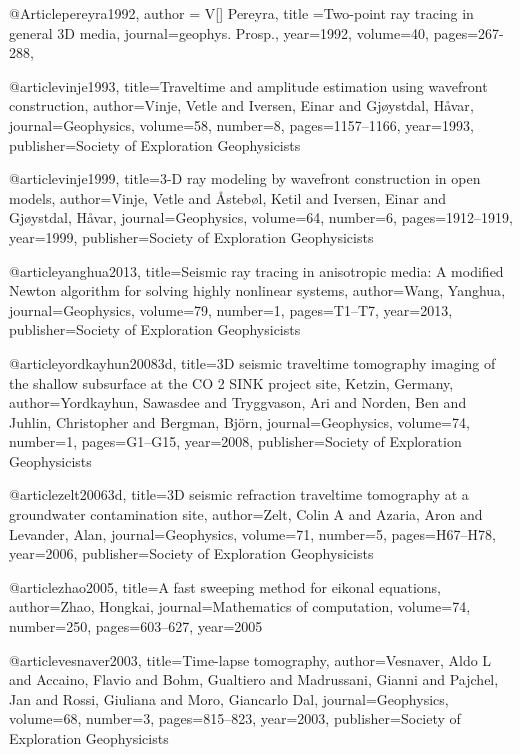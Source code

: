 @Article{pereyra1992,
  author = {V[] Pereyra},
  title ={Two-point ray tracing in general 3{D} media},
  journal={geophys. Prosp.},
  year=1992,
  volume=40,
  pages={267-288},
}


@article{vinje1993,
  title={Traveltime and amplitude estimation using wavefront construction},
  author={Vinje, Vetle and Iversen, Einar and Gj{\o}ystdal, H{\aa}var},
  journal={Geophysics},
  volume={58},
  number={8},
  pages={1157--1166},
  year={1993},
  publisher={Society of Exploration Geophysicists}
}

@article{vinje1999,
  title={3-D ray modeling by wavefront construction in open models},
  author={Vinje, Vetle and {\AA}steb{\o}l, Ketil and Iversen, Einar and Gj{\o}ystdal, H{\aa}var},
  journal={Geophysics},
  volume={64},
  number={6},
  pages={1912--1919},
  year={1999},
  publisher={Society of Exploration Geophysicists}
}

@article{yanghua2013,
  title={Seismic ray tracing in anisotropic media: A modified Newton algorithm for solving highly nonlinear systems},
  author={Wang, Yanghua},
  journal={Geophysics},
  volume={79},
  number={1},
  pages={T1--T7},
  year={2013},
  publisher={Society of Exploration Geophysicists}
}

@article{yordkayhun20083d,
  title={3{D} seismic traveltime tomography imaging of the shallow subsurface at the CO 2 SINK project site, Ketzin, Germany},
  author={Yordkayhun, Sawasdee and Tryggvason, Ari and Norden, Ben and Juhlin, Christopher and Bergman, Bj{\"o}rn},
  journal={Geophysics},
  volume={74},
  number={1},
  pages={G1--G15},
  year={2008},
  publisher={Society of Exploration Geophysicists}
}

@article{zelt20063d,
  title={3{D} seismic refraction traveltime tomography at a groundwater contamination site},
  author={Zelt, Colin A and Azaria, Aron and Levander, Alan},
  journal={Geophysics},
  volume={71},
  number={5},
  pages={H67--H78},
  year={2006},
  publisher={Society of Exploration Geophysicists}
}

@article{zhao2005,
  title={A fast sweeping method for eikonal equations},
  author={Zhao, Hongkai},
  journal={Mathematics of computation},
  volume={74},
  number={250},
  pages={603--627},
  year={2005}
}


@article{vesnaver2003,
  title={Time-lapse tomography},
  author={Vesnaver, Aldo L and Accaino, Flavio and Bohm, Gualtiero and Madrussani, Gianni and Pajchel, Jan and Rossi, Giuliana and Moro, Giancarlo Dal},
  journal={Geophysics},
  volume={68},
  number={3},
  pages={815--823},
  year={2003},
  publisher={Society of Exploration Geophysicists}
}

